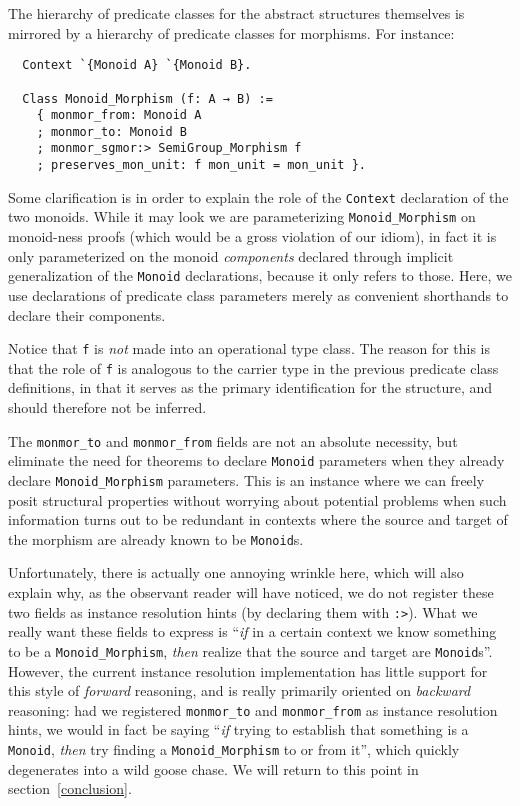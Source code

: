 \documentclass[a4paper,10pt,runningheads]{llncs}
\begin{document}
The hierarchy of predicate classes for the abstract structures themselves is mirrored by a hierarchy of predicate classes for morphisms. For instance:
\begin{lstlisting}
  Context `{Monoid A} `{Monoid B}.

  Class Monoid_Morphism (f: A → B) :=
    { monmor_from: Monoid A
    ; monmor_to: Monoid B
    ; monmor_sgmor:> SemiGroup_Morphism f
    ; preserves_mon_unit: f mon_unit = mon_unit }.
\end{lstlisting}

Some clarification is in order to explain the role of the \lstinline|Context| declaration of the two monoids. While it may look we are parameterizing \lstinline|Monoid_Morphism| on monoid-ness proofs (which would be a gross violation of our idiom), in fact it is only parameterized on the monoid \emph{components} declared through implicit generalization of the \lstinline|Monoid| declarations, because it only refers to those. Here, we use declarations of predicate class parameters merely as convenient shorthands to declare their components.

Notice that \lstinline|f| is \emph{not} made into an operational type class. The reason for this is that the role of \lstinline|f| is analogous to the carrier type in the previous predicate class definitions, in that it serves as the primary identification for the structure, and should therefore not be inferred.

The \lstinline|monmor_to| and \lstinline|monmor_from| fields are not an absolute necessity, but eliminate the need for theorems to declare \lstinline|Monoid| parameters when they already declare \lstinline|Monoid_Morphism| parameters. This is an instance where we can freely posit structural properties without worrying about potential problems when such information turns out to be redundant in contexts where the source and target of the morphism are already known to be \lstinline|Monoid|s.

Unfortunately, there is actually one annoying wrinkle here, which will also explain why, as the observant reader will have noticed, we do not register these two fields as instance resolution hints (by declaring them with \lstinline|:>|). What we really want these fields to express is ``\emph{if} in a certain context we know something to be a \lstinline|Monoid_Morphism|, \emph{then} realize that the source and target are \lstinline|Monoid|s''. However, the current instance resolution implementation has little support for this style of \emph{forward} reasoning, and is really primarily oriented on \emph{backward} reasoning: had we registered \lstinline|monmor_to| and \lstinline|monmor_from| as instance resolution hints, we would in fact be saying ``\emph{if} trying to establish that something is a \lstinline|Monoid|, \emph{then} try finding a \lstinline|Monoid_Morphism| to or from it'', which quickly degenerates into a wild goose chase. We will return to this point in section~\ref{conclusion}. %
\end{document}
